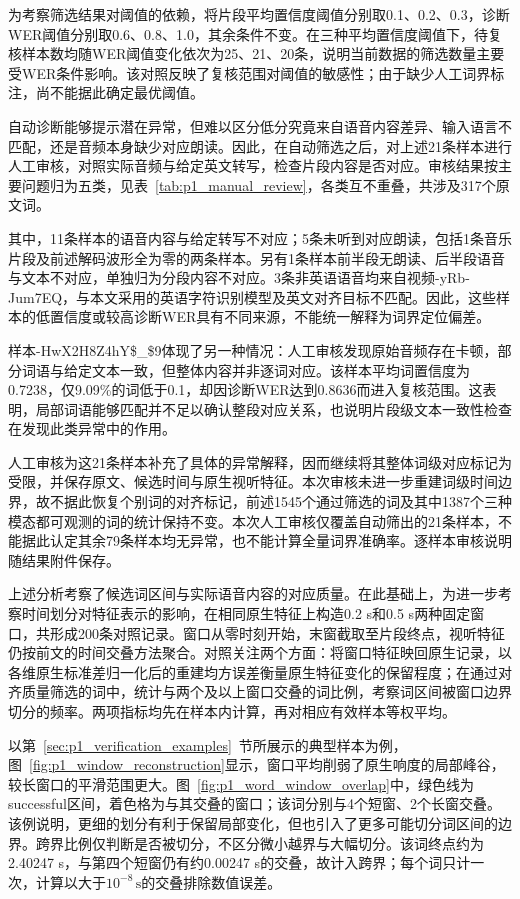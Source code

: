 为考察筛选结果对阈值的依赖，将片段平均置信度阈值分别取0.1、0.2、0.3，诊断WER阈值分别取0.6、0.8、1.0，其余条件不变。在三种平均置信度阈值下，待复核样本数均随WER阈值变化依次为25、21、20条，说明当前数据的筛选数量主要受WER条件影响。该对照反映了复核范围对阈值的敏感性；由于缺少人工词界标注，尚不能据此确定最优阈值。

自动诊断能够提示潜在异常，但难以区分低分究竟来自语音内容差异、输入语言不匹配，还是音频本身缺少对应朗读。因此，在自动筛选之后，对上述21条样本进行人工审核，对照实际音频与给定英文转写，检查片段内容是否对应。审核结果按主要问题归为五类，见表~\ref{tab:p1_manual_review}，各类互不重叠，共涉及317个原文词。



其中，11条样本的语音内容与给定转写不对应；5条未听到对应朗读，包括1条音乐片段及前述解码波形全为零的两条样本。另有1条样本前半段无朗读、后半段语音与文本不对应，单独归为分段内容不对应。3条非英语语音均来自视频-yRb-Jum7EQ，与本文采用的英语字符识别模型及英文对齐目标不匹配。因此，这些样本的低置信度或较高诊断WER具有不同来源，不能统一解释为词界定位偏差。

样本-HwX2H8Z4hY\$\_\$9体现了另一种情况：人工审核发现原始音频存在卡顿，部分词语与给定文本一致，但整体内容并非逐词对应。该样本平均词置信度为0.7238，仅9.09\%的词低于0.1，却因诊断WER达到0.8636而进入复核范围。这表明，局部词语能够匹配并不足以确认整段对应关系，也说明片段级文本一致性检查在发现此类异常中的作用。

人工审核为这21条样本补充了具体的异常解释，因而继续将其整体词级对应标记为受限，并保存原文、候选时间与原生视听特征。本次审核未进一步重建词级时间边界，故不据此恢复个别词的对齐标记，前述1545个通过筛选的词及其中1387个三种模态都可观测的词的统计保持不变。本次人工审核仅覆盖自动筛出的21条样本，不能据此认定其余79条样本均无异常，也不能计算全量词界准确率。逐样本审核说明随结果附件保存。

\label{sec:p1_window_analysis}

上述分析考察了候选词区间与实际语音内容的对应质量。在此基础上，为进一步考察时间划分对特征表示的影响，在相同原生特征上构造0.2 s和0.5 s两种固定窗口，共形成200条对照记录。窗口从零时刻开始，末窗截取至片段终点，视听特征仍按前文的时间交叠方法聚合。对照关注两个方面：将窗口特征映回原生记录，以各维原生标准差归一化后的重建均方误差衡量原生特征变化的保留程度；在通过对齐质量筛选的词中，统计与两个及以上窗口交叠的词比例，考察词区间被窗口边界切分的频率。两项指标均先在样本内计算，再对相应有效样本等权平均。

以第~\ref{sec:p1_verification_examples}~节所展示的典型样本为例，图~\ref{fig:p1_window_reconstruction}显示，窗口平均削弱了原生响度的局部峰谷，较长窗口的平滑范围更大。图~\ref{fig:p1_word_window_overlap}中，绿色线为successful区间，着色格为与其交叠的窗口；该词分别与4个短窗、2个长窗交叠。该例说明，更细的划分有利于保留局部变化，但也引入了更多可能切分词区间的边界。跨界比例仅判断是否被切分，不区分微小越界与大幅切分。该词终点约为2.40247 s，与第四个短窗仍有约0.00247 s的交叠，故计入跨界；每个词只计一次，计算以大于$10^{-8}\,\mathrm{s}$的交叠排除数值误差。

